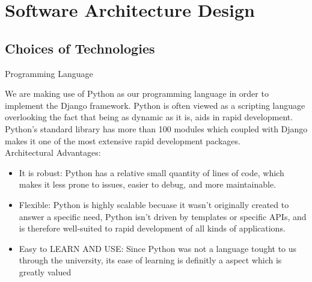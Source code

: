 \documentclass[12pt]{article}
\begin{document}
				
	
	\section{Software Architecture Design}
		\vspace{0.2in}
		
		\subsection{Choices of Technologies}
					Programming Language
					
					 We are making use of Python as our programming language in order to implement the Django framework. Python is often viewed as a scripting language overlooking the fact that being as dynamic as it is, aids in rapid development. Python's standard library has more than 100 modules which coupled with Django makes it one of the most extensive rapid development packages.\\[1em]
					Architectural Advantages:
					\begin{itemize}
						\item It is robust: Python has a relative small quantity of lines of code, which makes it less prone to issues, easier to debug, and more maintainable.
						\item Flexible: Python is highly scalable becuase it wasn't originally created to answer a specific need, Python isn't driven by templates or specific APIs, and is therefore well-suited to rapid development of all kinds of applications.
						\item Easy to LEARN AND USE: Since Python was not a language tought to us through the university, its ease of learning is definitly a aspect which is greatly valued
					\end{itemize}
					
\end{document}
